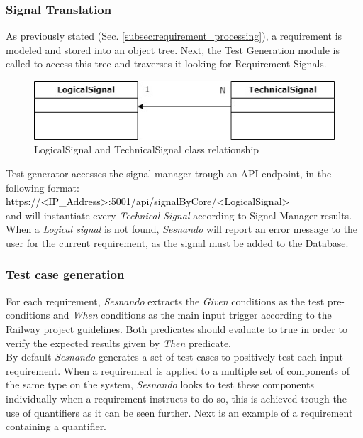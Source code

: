 \subsubsection{Signal Translation}
\label{subsubsec:signal_translation}

As previously stated (Sec. \ref{subsec:requirement_processing}), a requirement is modeled and stored into an object tree. Next, the Test Generation module is called to access this tree and traverses it looking for Requirement Signals.

\begin{figure}[H]
    \centering
    \includegraphics[scale=0.625]{images/class_diag_logical_technical_signal.jpg}
    \caption{LogicalSignal and TechnicalSignal class relationship}
    \label{fig:req_parse_tree}
\end{figure}

Test generator accesses the signal manager trough an API endpoint, in the following format:\\
\textcolor{black}{https://<IP\_Address>:5001/api/signalByCore/<LogicalSignal>}\\
and will instantiate every \textit{Technical Signal} according to Signal Manager results. When a \textit{Logical signal} is not found, \textit{Sesnando} will report an error message to the user for the current requirement, as the signal must be added to the Database.


\subsubsection{Test case generation}
\label{subsubsec:test_cases}


For each requirement, \textit{Sesnando} extracts the \textit{Given} conditions as the test pre-conditions and \textit{When} conditions as the main input trigger according to the Railway project guidelines. Both predicates should evaluate to true in order to verify the expected results given by \textit{Then} predicate.\\

By default \textit{Sesnando} generates a set of test cases to positively test each input requirement. When a requirement is applied to a multiple set of components of the same type on the system, \textit{Sesnando} looks to test these components individually when a requirement instructs to do so, this is achieved trough the use of quantifiers as it can be seen further. Next is an example of a requirement containing a quantifier.\\

